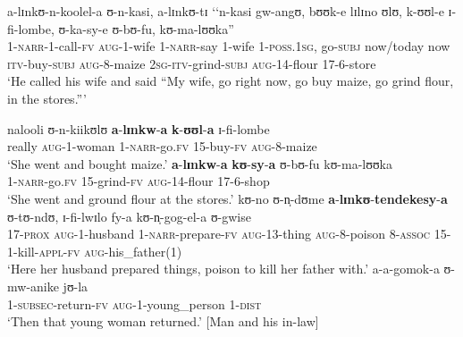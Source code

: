 \begin{exe}
\ex \label{exNARRnosequence1}
\begin{xlist}
\ex \label{exNARRnosequence1sentence1} \gll a-lɪnkʊ-n-koolel-a ʊ-n-kasi, a-lɪnkʊ-tɪ \textup{\lq\lq}n-kasi gw-angʊ, bʊʊk-e lɪlɪno ʊlʊ, k-ʊʊl-e ɪ-fi-lombe, ʊ-ka-sy-e ʊ-bʊ-fu, kʊ-ma-lʊʊka\textup{''}\\
1-\textsc{narr}-1-call-\textsc{fv} \textsc{aug}-1-wife 1-\textsc{narr}-say \phantom{\lq\lq}1-wife 1-\textsc{poss.1sg}, go-\textsc{subj} now/today now \textsc{itv}-buy-\textsc{subj} \textsc{aug}-8-maize \textsc{2sg}-\textsc{itv}-grind-\textsc{subj} \textsc{aug}-14-flour 17-6-store\\
\glt `He called his wife and said ``My wife, go right now, go buy maize, go grind flour, in the stores.''{}'

\ex \label{exNARRnosequence1sentence2} \gll nalooli ʊ-n-kiikʊlʊ \textbf{a}-\textbf{lɪnkw}-\textbf{a} \textbf{k}-\textbf{ʊʊl}-\textbf{a} ɪ-fi-lombe\\
really \textsc{aug}-1-woman 1-\textsc{narr}-go.\textsc{fv} 15-buy-\textsc{fv} \textsc{aug}-8-maize\\
\glt `She went and bought maize.'
\ex \label{exNARRnosequence1sentence3} \gll \textbf{a}-\textbf{lɪnkw}-\textbf{a} \textbf{kʊ}-\textbf{sy}-\textbf{a} ʊ-bʊ-fu kʊ-ma-lʊʊka\\
1-\textsc{narr}-go.\textsc{fv} 15-grind-\textsc{fv} \textsc{aug}-14-flour 17-6-shop\\
\glt `She went and ground flour at the stores.'
\ex \label{exNARRnosequence1sentence4} \gll kʊ-no ʊ-n̩-dʊme \textbf{a}-\textbf{lɪnkʊ}-\textbf{tendekesy}-\textbf{a} ʊ-tʊ-ndʊ, ɪ-fi-lwɪlo fy-a kʊ-n̩-gog-el-a ʊ-gwise\\
17-\textsc{prox} \textsc{aug}-1-husband 1-\textsc{narr}-prepare-\textsc{fv} \textsc{aug}-13-thing \textsc{aug}-8-poison 8-\textsc{assoc} 15-1-kill-\textsc{appl}-\textsc{fv} \textsc{aug}-his\_father(1)\\
\glt `Here her husband prepared things, poison to kill her father with.'
\ex \label{exNARRnosequence1sentence5} \gll a-a-gomok-a ʊ-mw-anike jʊ-la\\
1-\textsc{subsec}-return-\textsc{fv} \textsc{aug}-1-young\_person 1-\textsc{dist}\\
\glt `Then that young woman returned.' [Man and his in-law]
\end{xlist}
\end{exe}

